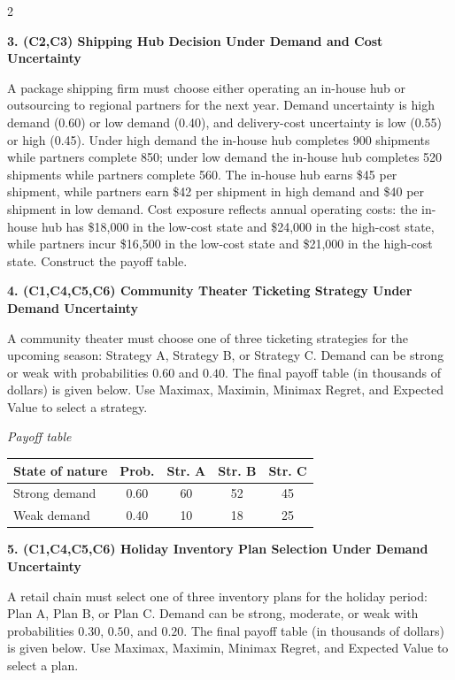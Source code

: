 \documentclass[12pt]{article}
\newcommand{\SubsectionBox}[1]{%
	\noindent\colorbox{gray!30}{%
		\parbox{\linewidth}{\textbf{#1}}%
	}\par\vspace{0.35cm}%
}
\begin{document}
\begin{multicols}{2}
		\vspace{0.25cm}
		\SubsectionBox{3. (C2,C3) Shipping Hub Decision Under Demand and Cost Uncertainty}\vspace{-0.25cm}
		A package shipping firm must choose either operating an in-house hub or outsourcing to regional partners for the next year.
		Demand uncertainty is high demand (0.60) or low demand (0.40), and delivery-cost uncertainty is low (0.55) or high (0.45).
		Under high demand the in-house hub completes 900 shipments while partners complete 850; under low demand the in-house hub completes
		520 shipments while partners complete 560. The in-house hub earns \$45 per shipment, while partners earn \$42 per shipment in high demand
		and \$40 per shipment in low demand. Cost exposure reflects annual operating costs: the in-house hub has \$18{,}000 in the low-cost state
		and \$24{,}000 in the high-cost state, while partners incur \$16{,}500 in the low-cost state and \$21{,}000 in the high-cost state.
		Construct the payoff table.

		\vspace{0.25cm}
		\SubsectionBox{4. (C1,C4,C5,C6) Community Theater Ticketing Strategy Under Demand Uncertainty}\vspace{-0.25cm}
		A community theater must choose one of three ticketing strategies for the upcoming season: Strategy A, Strategy B,
		or Strategy C. Demand can be strong or weak with probabilities $0.60$ and $0.40$. The final payoff table (in thousands of dollars)
		is given below. Use Maximax, Maximin, Minimax Regret, and Expected Value to select a strategy.

		\begin{center}
			\textit{Payoff table} \\
			\begin{tabular}{l c c c c}
				\hline
				State of nature & Prob. & Str. A & Str. B & Str. C \\
				\hline
				Strong demand & 0.60 & 60 & 52 & 45 \\
				Weak demand & 0.40 & 10 & 18 & 25 \\
				\hline
			\end{tabular}
		\end{center}

		\vspace{0.25cm}
		\SubsectionBox{5. (C1,C4,C5,C6) Holiday Inventory Plan Selection Under Demand Uncertainty}\vspace{-0.25cm}
		A retail chain must select one of three inventory plans for the holiday period: Plan A, Plan B, or Plan C.
		Demand can be strong, moderate, or weak with probabilities $0.30$, $0.50$, and $0.20$. The final payoff table
		(in thousands of dollars) is given below. Use Maximax, Maximin, Minimax Regret, and Expected Value to select a plan.


\end{multicols}
\end{document}
